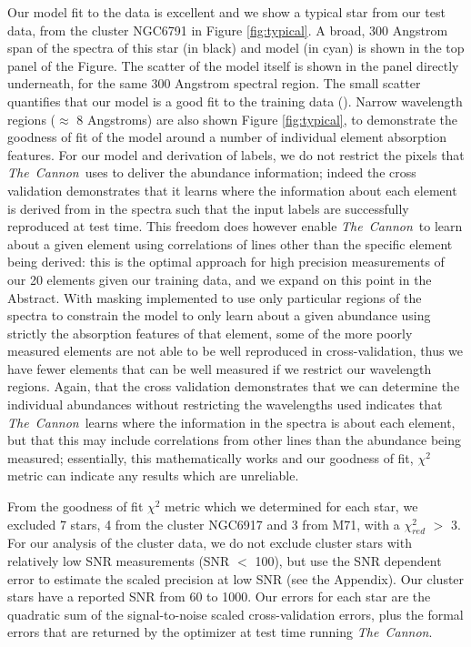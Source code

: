 \documentclass[14pt, preprint2]{aastex6}
\newcommand{\project}[1]{\textsl{#1}}
\newcommand{\tc}{\project{The~Cannon}}
\begin{document}
Our model fit to the data is excellent and we show a typical star from our test data, from the cluster NGC6791 in Figure \ref{fig:typical}. A broad, 300 Angstrom span of the spectra of this star (in black) and model (in cyan) is shown in the top panel of the Figure. The scatter of the model itself is shown in the panel directly underneath, for the same 300 Angstrom spectral region. The small scatter quantifies that our model is a good fit to the training data (\citet{Ness2015}). Narrow wavelength regions ($\approx$ 8 Angstroms) are also shown Figure \ref{fig:typical}, to demonstrate the goodness of fit of the model around a number of individual element absorption features. For our model and derivation of labels, we do not restrict the pixels that \tc\ uses to deliver the abundance information; indeed the cross validation demonstrates that it learns where the information about each element is derived from in the spectra such that the input labels are successfully reproduced at test time. This freedom does however enable \tc\ to learn about a given element using correlations of lines other than the specific element being derived: this is the optimal approach for high precision measurements of our 20 elements given our training data, and we expand on this point in the Abstract. With masking implemented to use only particular regions of the spectra to constrain the model to only learn about a given abundance using strictly the absorption features of that element, some of the more poorly measured elements are not able to be well reproduced in cross-validation, thus we have fewer elements that can be well measured if we restrict our wavelength regions. Again, that the cross validation demonstrates that we can determine the individual abundances without restricting the wavelengths used indicates that \tc\ learns where the information in the spectra is about each element, but that this may include correlations from other lines than the abundance being measured; essentially, this mathematically works and our goodness of fit, $\chi^2$ metric can indicate any results which are unreliable. 

From the goodness of fit $\chi^2$ metric which we determined for each star, we excluded 7 stars, 4 from the cluster NGC6917 and 3 from M71, with a $\chi_{red}^2$ $>$ 3. For our analysis of the cluster data, we do not exclude cluster stars with relatively low SNR measurements (SNR $<$ 100), but use the SNR dependent error to estimate the scaled precision at low SNR (see the Appendix). Our cluster stars have a reported SNR from 60 to 1000. Our errors for each star are the quadratic sum of the signal-to-noise scaled cross-validation errors, plus the formal errors that are returned by the optimizer at test time running \tc. 
\end{document}
